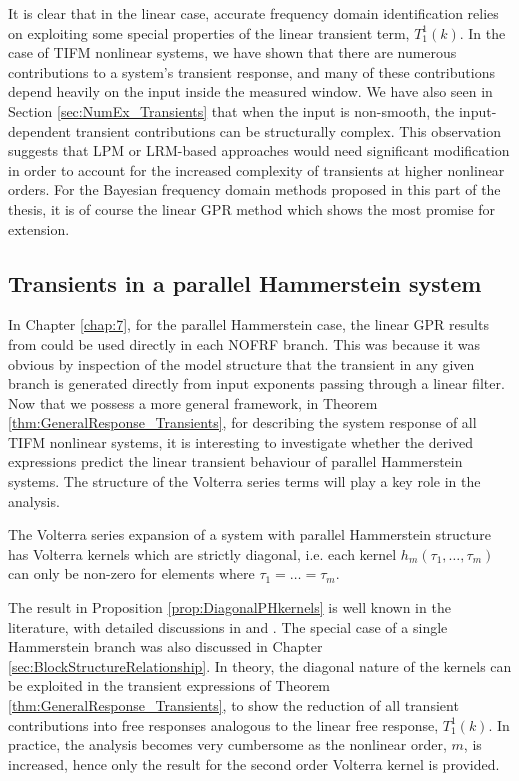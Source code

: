 It is clear that in the linear case, accurate frequency domain identification relies on exploiting some special properties of the linear transient term, $T_1^1(k)$. In the case of TIFM nonlinear systems, we have shown that there are numerous contributions to a system's transient response, and many of these contributions depend heavily on the input inside the measured window. We have also seen in Section \ref{sec:NumEx_Transients} that when the input is non-smooth, the input-dependent transient contributions can be structurally complex. This observation suggests that LPM or LRM-based approaches would need significant modification in order to account for the increased complexity of transients at higher nonlinear orders. For the Bayesian frequency domain methods proposed in this part of the thesis, it is of course the linear GPR method which shows the most promise for extension.

\subsection{Transients in a parallel Hammerstein system}

In Chapter \ref{chap:7}, for the parallel Hammerstein case, the linear GPR results from \cite{Lataire2016} could be used directly in each NOFRF branch. This was because it was obvious by inspection of the model structure that the transient in any given branch is generated directly from input exponents passing through a linear filter. Now that we possess a more general framework, in Theorem \ref{thm:GeneralResponse_Transients}, for describing the system response of all TIFM nonlinear systems, it is interesting to investigate whether the derived expressions predict the linear transient behaviour of parallel Hammerstein systems. The structure of the Volterra series terms will play a key role in the analysis. 

\begin{proposition}
\label{prop:DiagonalPHkernels}
The Volterra series expansion of a system with parallel Hammerstein structure has Volterra kernels which are strictly diagonal, i.e. each kernel $h_m(\tau_1,\hdots,\tau_m)$ can only be non-zero for elements where $\tau_1 = \hdots = \tau_m$.
\end{proposition}

The result in Proposition \ref{prop:DiagonalPHkernels} is well known in the literature, with detailed discussions in \cite{Westwick2003} and \cite{Kibangou2010}. The special case of a single Hammerstein branch was also discussed in Chapter \ref{sec:BlockStructureRelationship}. In theory, the diagonal nature of the kernels can be exploited in the transient expressions of Theorem \ref{thm:GeneralResponse_Transients}, to show the reduction of all transient contributions into free responses analogous to the linear free response, $T_1^1(k)$. In practice, the analysis becomes very cumbersome as the nonlinear order, $m$, is increased, hence only the result for the second order Volterra kernel is provided.


